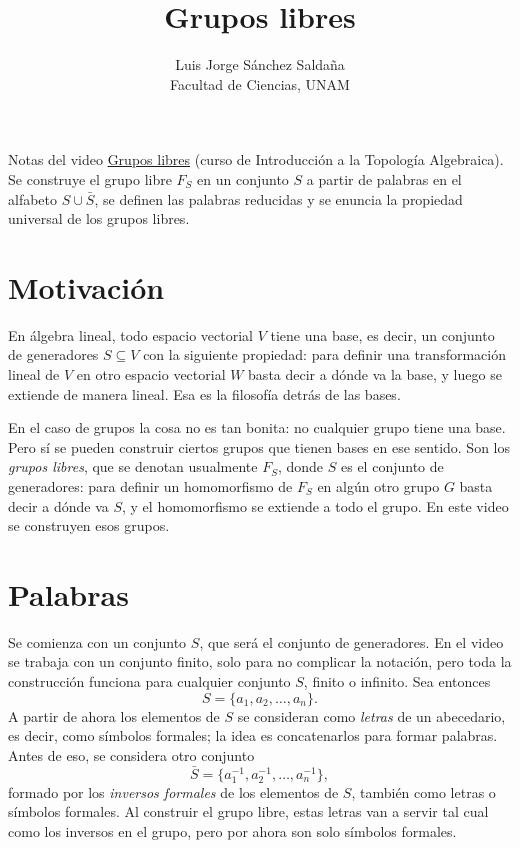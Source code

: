 \documentclass[11pt]{article}
\title{Grupos libres}
\author{Luis Jorge Sánchez Saldaña\\[2pt]\small Facultad de Ciencias, UNAM}
\date{}
\begin{document}
\maketitle

\noindent\small Notas del video
\href{https://www.youtube.com/watch?v=N-8tx7lDRBY}{\guillemotleft{}Grupos libres\guillemotright{}}
(curso de Introducción a la Topología Algebraica). Se construye el grupo libre $F_S$ en un conjunto $S$ a partir de palabras en el alfabeto $S\cup\bar S$, se definen las palabras reducidas y se enuncia la propiedad universal de los grupos libres.
\normalsize

\section*{Motivación}

En álgebra lineal, todo espacio vectorial $V$ tiene una base, es decir, un conjunto de generadores $S\subseteq V$ con la siguiente propiedad: para definir una transformación lineal de $V$ en otro espacio vectorial $W$ basta decir a dónde va la base, y luego se extiende de manera lineal. Esa es la filosofía detrás de las bases.

En el caso de grupos la cosa no es tan bonita: no cualquier grupo tiene una base. Pero sí se pueden construir ciertos grupos que tienen bases en ese sentido. Son los \emph{grupos libres}, que se denotan usualmente $F_S$, donde $S$ es el conjunto de generadores: para definir un homomorfismo de $F_S$ en algún otro grupo $G$ basta decir a dónde va $S$, y el homomorfismo se extiende a todo el grupo. En este video se construyen esos grupos.

\section*{Palabras}

Se comienza con un conjunto $S$, que será el conjunto de generadores. En el video se trabaja con un conjunto finito, solo para no complicar la notación, pero toda la construcción funciona para cualquier conjunto $S$, finito o infinito. Sea entonces
\[
  S=\{a_1,a_2,\dots,a_n\}.
\]
A partir de ahora los elementos de $S$ se consideran como \emph{letras} de un abecedario, es decir, como símbolos formales; la idea es concatenarlos para formar palabras. Antes de eso, se considera otro conjunto
\[
  \bar S=\{a_1^{-1},a_2^{-1},\dots,a_n^{-1}\},
\]
formado por los \emph{inversos formales} de los elementos de $S$, también como letras o símbolos formales. Al construir el grupo libre, estas letras van a servir tal cual como los inversos en el grupo, pero por ahora son solo símbolos formales.
\end{document}
